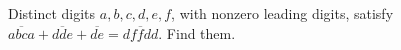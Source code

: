 Distinct digits $a,b,c,d,e,f$, with nonzero leading digits, satisfy $\overline{abca}+\overline{dde}+\overline{de}=\overline{dffdd}$. Find them.
